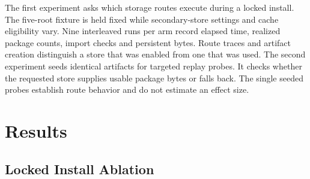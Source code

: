 \documentclass[
  11pt,
  letterpaper,
]{article}
\begin{document}
The first experiment asks which storage routes execute during a locked
install. The five-root fixture is held fixed while secondary-store
settings and cache eligibility vary. Nine interleaved runs per arm
record elapsed time, realized package counts, import checks and
persistent bytes. Route traces and artifact creation distinguish a store
that was enabled from one that was used. The second experiment seeds
identical artifacts for targeted replay probes. It checks whether the
requested store supplies usable package bytes or falls back. The single
seeded probes establish route behavior and do not estimate an effect
size.

\section{Results}\label{results}

\subsection{Locked Install Ablation}\label{locked-install-ablation}
\end{document}
